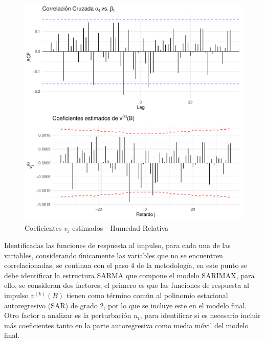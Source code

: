 \documentclass[12pt,oneside]{book}\usepackage[]{graphicx}\usepackage[]{color}
\makeatletter
\def\maxwidth{ %
  \ifdim\Gin@nat@width>\linewidth
    \linewidth
  \else
    \Gin@nat@width
  \fi
}
\newenvironment{knitrout}{}{} %
\theoremstyle{definition} %
\makeatother
\begin{document}
\begin{enumerate}
\begin{knitrout}
\color{fgcolor}\begin{figure}[H]

{\centering \includegraphics[width=\maxwidth]{figure/unnamed-chunk-44-1} 

}

\caption{\label{fig:vj4} Coeficientes $v_j$ estimados - Humedad Relativa }\label{fig:unnamed-chunk-44}
\end{figure}


\end{knitrout}



\end{enumerate}


Identificadas las funciones de respuesta al impulso, para cada una de las variables, considerando únicamente las variables que no se encuentren correlacionadas, 
se continua con el paso 4 de la metodología, en este punto se debe identificar la estructura SARMA que compone el modelo SARIMAX, para ello, se consideran dos factores, el primero es que las funciones de respuesta al impulso $v^{(k)}(B)$ tienen como término común al polinomio estacional autoregresivo  (SAR) de grado 2, por lo que se incluye este en el modelo final. Otro factor a analizar es la perturbación $n_t$, para identificar si es necesario incluir más coeficientes tanto en la parte autoregresiva como media móvil del modelo final.
\end{document}

